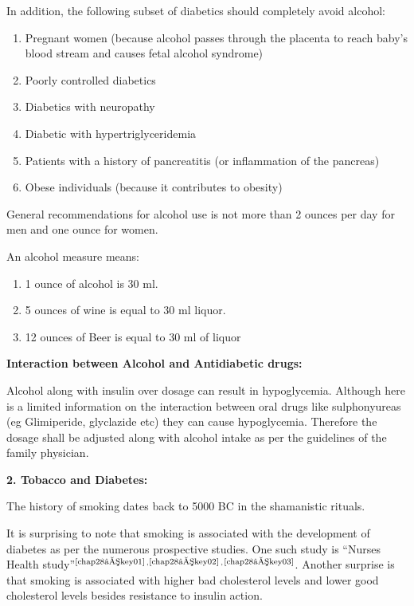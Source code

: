 In addition, the following subset of diabetics should completely avoid alcohol:

\begin{enumerate}[•]
\itemsep=0pt
\item Pregnant women (because alcohol passes through the placenta to reach baby’s blood stream and causes fetal alcohol syndrome)
\item Poorly controlled diabetics
\item Diabetics with neuropathy
\item Diabetic with hypertriglyceridemia
\item Patients with a history of pancreatitis (or inflammation of the pancreas)
\item Obese individuals (because it contributes to obesity)
\end{enumerate}

General recommendations for alcohol use is not more than 2 ounces per day for men and one ounce for women.

An alcohol measure means:

\begin{enumerate}[•]
\itemsep=0pt
\item 1 ounce of alcohol is 30 ml.
\item 5 ounces of wine is equal to 30 ml liquor.
\item 12 ounces of Beer is equal to 30 ml of liquor
\end{enumerate}

\noindent\textbf{Interaction between Alcohol and Antidiabetic drugs:}

Alcohol along with insulin over dosage can result in hypoglycemia. Although here is a limited information on the interaction between oral drugs like sulphonyureas (eg Glimiperide, glyclazide etc) they can cause hypoglycemia. Therefore the dosage shall be adjusted along with alcohol intake as per the guidelines of the family physician.

\noindent\textbf{2. Tobacco and Diabetes:}

The history of smoking dates back to 5000 BC in the shamanistic rituals.

It is surprising to note that smoking is associated with the development of diabetes as per the numerous prospective studies. One such study is “Nurses Health study”$^{\text{\cite{chap28–key01}}}$$^,$$^{\text{\cite{chap28–key02}}}$$^,$$^{\text{\cite{chap28–key03}}}$. Another surprise is that smoking is associated with higher bad cholesterol levels and lower good cholesterol levels besides resistance to insulin action.

